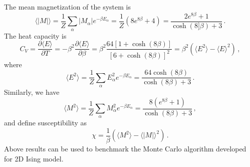 The mean magnetization of the system is 
\begin{equation}
\langle|M|\rangle=\frac{1}{Z}\sum_{\alpha} |M_\alpha| e^{-\beta E_\alpha}=\frac{1}{Z}\left(8e^{8\beta}+4\right)
=\frac{2e^{8\beta}+1}{\cosh\left(8]\beta\right)+3}\,. 
\end{equation}
The heat capacity is 
\begin{equation}\label{eq:cv}
C_V=\frac{\partial \langle E\rangle}{\partial T}=-\beta^2\frac{\partial \langle E\rangle}{\partial \beta}
=\beta^2\frac{64\left[1+\cosh\left(8\beta\right)\right]}{\left[6+\cosh\left(8\beta\right)\right]^2}
=\beta^2\left(\langle E^2\rangle-\langle E\rangle^2\right)\,,
\end{equation}
where 
\begin{equation}
\langle E^2\rangle=\frac{1}{Z}\sum_{\alpha}E^2_\alpha e^{-\beta E_\alpha}=\frac{64\cosh\left(8\beta\right)}{\cosh\left(8\beta\right)+3}\,. 
\end{equation}
Similarly, we have 
\begin{equation}
\langle M^2\rangle=\frac{1}{Z}\sum_{\alpha} M^2_\alpha e^{-\beta E_\alpha}=\frac{8\left(e^{8\beta}+1\right)}{\cosh\left(8\beta\right)+3}\,, 
\end{equation}
and define susceptibility as 
\begin{equation}\label{eq:chi}
\chi=\frac{1}{\beta}\left(\langle M^2\rangle -\langle |M|\rangle ^2\right)\,. 
\end{equation}
Above results can be used to benchmark the Monte Carlo algorithm developed for 2D Ising model. 

